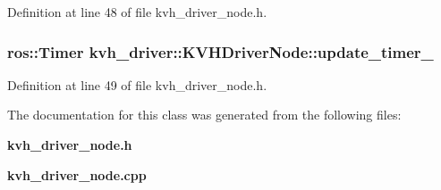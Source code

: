 \-Definition at line 48 of file kvh\-\_\-driver\-\_\-node.\-h.

\subsubsection[{update\-\_\-timer\-\_\-}]{\setlength{\rightskip}{0pt plus 5cm}ros\-::\-Timer {\bf kvh\-\_\-driver\-::\-K\-V\-H\-Driver\-Node\-::update\-\_\-timer\-\_\-}\hspace{0.3cm}{\ttfamily  [private]}}\label{classkvh__driver_1_1KVHDriverNode_ade628598424122057bfac93a30011bea}


\-Definition at line 49 of file kvh\-\_\-driver\-\_\-node.\-h.



\-The documentation for this class was generated from the following files\-:\begin{DoxyCompactItemize}
\item 
{\bf kvh\-\_\-driver\-\_\-node.\-h}\item 
{\bf kvh\-\_\-driver\-\_\-node.\-cpp}\end{DoxyCompactItemize}
